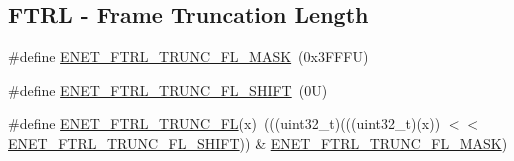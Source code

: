 \subsection*{F\+T\+RL -\/ Frame Truncation Length}
\begin{DoxyCompactItemize}
\item 
\#define \mbox{\hyperlink{group___e_n_e_t___register___masks_ga05457257c070632d99a2691b0859b4a9}{E\+N\+E\+T\+\_\+\+F\+T\+R\+L\+\_\+\+T\+R\+U\+N\+C\+\_\+\+F\+L\+\_\+\+M\+A\+SK}}~(0x3\+F\+F\+F\+U)
\item 
\#define \mbox{\hyperlink{group___e_n_e_t___register___masks_gabde46c4ee41f8745b475d4d715455332}{E\+N\+E\+T\+\_\+\+F\+T\+R\+L\+\_\+\+T\+R\+U\+N\+C\+\_\+\+F\+L\+\_\+\+S\+H\+I\+FT}}~(0\+U)
\item 
\#define \mbox{\hyperlink{group___e_n_e_t___register___masks_ga82b2ab08109ba85730009d0705983cb1}{E\+N\+E\+T\+\_\+\+F\+T\+R\+L\+\_\+\+T\+R\+U\+N\+C\+\_\+\+FL}}(x)~(((uint32\+\_\+t)(((uint32\+\_\+t)(x)) $<$$<$ \mbox{\hyperlink{group___e_n_e_t___register___masks_gabde46c4ee41f8745b475d4d715455332}{E\+N\+E\+T\+\_\+\+F\+T\+R\+L\+\_\+\+T\+R\+U\+N\+C\+\_\+\+F\+L\+\_\+\+S\+H\+I\+FT}})) \& \mbox{\hyperlink{group___e_n_e_t___register___masks_ga05457257c070632d99a2691b0859b4a9}{E\+N\+E\+T\+\_\+\+F\+T\+R\+L\+\_\+\+T\+R\+U\+N\+C\+\_\+\+F\+L\+\_\+\+M\+A\+SK}})
\end{DoxyCompactItemize}
